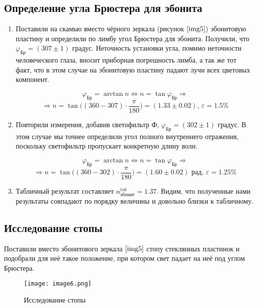 \documentclass[a4paper,12pt]{article} %
\begin{document}
\subsection{Определение угла Брюстера для эбонита}

\begin{enumerate}
    \item Поставили на скамью вместо чёрного зеркала (рисунок $\ref{img5}$) эбонитовую пластину и определили по лимбу угол Брюстера для эбонита. Получили, что $\varphi_{\text{Бр}}=(307\pm1)$ градус. Неточность установки угла, помимо неточности человеческого глаза, вносит приборная погрешность лимба, а так же тот факт, что в этом случае на эбонитовую пластину падают лучи всех цветовых компонент.

    \[ \varphi_{\text{Бр}}=\arctan{n} \Longleftrightarrow n=\tan{\varphi_{\text{Бр}}} \Longrightarrow \]
    \[ \Longrightarrow n=\tan{\Big((360-307)\cdot\frac{\pi}{180}\Big)} = (1.33\pm0.02)\text{, }\varepsilon=1.5\% \]

    \item Повторили измерения, добавив светофильтр $\text{Ф}$, $\varphi_{\text{Бр}}=(302\pm1)$ градус. В этом случае мы точнее определили угол полного внутреннего отражения, поскольку светофильтр пропускает конкретную длину волн.

    \[ \varphi_{\text{Бр}}=\arctan{n} \Longleftrightarrow n=\tan{\varphi_{\text{Бр}}} \Longrightarrow \]
    \[ \Longrightarrow n=\tan{\Big((360-302)\cdot\frac{\pi}{180}\Big)} = (1.60\pm0.02)\text{ рад, }\varepsilon=1.25\% \]

    \item Табличный результат составляет $n^{tab}_{\text{эбонит}}=1.37$. Видим, что полученные нами результаты совпадают по порядку величины и довольно близки к табличному.
\end{enumerate}

\subsection{Исследование стопы}

Поставили вместо эбонитового зеркала $\ref{img5}$ стопу стеклянных пластинок и подобрали для неё такое положение, при котором свет падает на неё под углом Брюстера.

\begin{wrapfigure}{r}{0.35\linewidth}
    \texttt{[image: image6.png]}
    \caption{Исследование стопы}
    \label{img6}
\end{wrapfigure}
\end{document}
